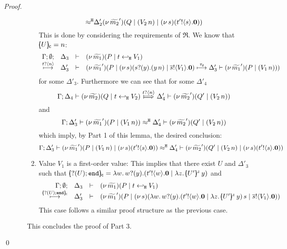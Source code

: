 \begin{proof}
\begin{enumerate}[$-$]
\begin{enumerate}[(a)]
\begin{enumerate}
\[								{\approx^\mathtt{H}}
								{\Delta_2'}{(\nu\, \widetilde{m_2}')(Q \;|\; (V_2\, {n}) \;|\; (\nu\, s)(t' ! \langle s \rangle . \mathbf{0}))}
							\]
							This is done by considering the requirements of $\Re$.
							We know that $[\!\!(U)\!\!]_{\mathsf{c}} = n$:
							\[
								\begin{array}{rcll} \Gamma; \emptyset; &\Delta_3& \vdash& (\nu\, \widetilde{m_1})(P \;|\; t \hookleftarrow_{\mathtt{H}} V_1  ) \\ \stackrel{t ? \langle n \rangle}{\longmapsto} &\Delta_3'& \vdash &  (\nu\, \widetilde{m_1}')(P \;|\; (\nu\, s)(s ? (y) . (y\, {n}) \;|\; \overline{s} ! \langle V_1 \rangle . \mathbf{0})  \stackrel{\tau_{\mathsf{d}}}{\longmapsto} \Delta'_3 \vdash (\nu\, \widetilde{m_1}')(P \;|\; (V_1\, {n})) ) \end{array} 
							\]
							for some $\Delta'_3$.
							Furthermore we can see that for some $\Delta'_4$
							\[
								\horel{\Gamma}{\Delta_4}{\newsp{\widetilde{m_2}}{Q \Par \htrigger{t}{V_2}  } }
								{\Hby{\bactinp{t}{n}}}
								{\Delta_4'}{\newsp{\widetilde{m_2}'}{Q' \Par (\appl{V_2}{n})}}
							\]
							and
							\[
								\Gamma; \Delta_3' \vdash (\nu\, \widetilde{m_1}')(P \;|\; (V_1\, {n})) \approx^\mathtt{H} \Delta_4' \vdash (\nu\, \widetilde{m_2}')(Q' \;|\; (V_2\, {n}))
							\]
							which imply, by Part 1 of this lemma, the desired conclusion:
							\[
								\Gamma; \Delta_3' \vdash (\nu\, \widetilde{m_1}')(P \;|\; (V_1\, {n}) \;|\; (\nu\, s)(t' ! \langle s \rangle . \mathbf{0})) \approx^\mathtt{H} \Delta_4' \vdash (\nu\, \widetilde{m_2}')(Q' \;|\; (V_2\, {n}) \;|\; (\nu\, s)(t' ! \langle s \rangle . \mathbf{0}))
							\]

						\item	Value $V_1$ is a first-order value: This implies that there exist $U$ and $\Delta'_3$
								such that $\omapchar{\btinp{U} \tinact} = \abs{w}{ \binp{w}{y} ( \bout{t'}{w} \inact \Par \appl{\abs{z}{\mapchar{U'}{z}}}{y} ) } $
								and
								\[	
									\mhorel{\Gamma}{\Delta_3}{\newsp{\widetilde{m_1}}{P \Par \htrigger{t}{V_1}  } }
									{\hby{\omapchar{\btinp{U}\tinact}}}
									{\Delta_3'}{}
									{\newsp{\widetilde{m_1}'}{P \Par \newsp{s}{\appl{\abs{w}{ \binp{w}{y} ( \bout{t'}{w} \inact \Par \appl{\abs{z}{\mapchar{U'}{z}}}{y} ) }}{s} \Par \bout{\dual{s}}{V_1} \inact}}}
								\]
							This case follows a similar proof structure as the previous case.
				\end{enumerate}
				This concludes the proof of Part 3. 
	\end{enumerate}
\end{enumerate}
\qed
\end{proof}

